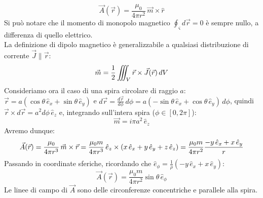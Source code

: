 \documentclass[]{article}
\begin{document}
\begin{equation}
	\vec{A}(\vec{r}) = \displaystyle\frac{\mu_0}{4\pi r^2} \, \vec{m}\times\hat{r}
	\label{eq:po-vett-sp-lont}
\end{equation}
Si può notare che il momento di monopolo magnetico $ \oint_{\varsigma} d\vec{r} = 0  $ è sempre nullo, a differenza di quello elettrico. \\ 
%
La definizione di dipolo magnetico è generalizzabile a qualsiasi distribuzione di corrente $ \vec{J} \parallel \vec{r} $:
\begin{equation}
	\vec{m} = \frac{1}{2} \iiint_V \vec{r}\times\vec{J}(\vec{r}) \, dV
	\label{eq:dip-mag-def}
\end{equation}
%
Consideriamo ora il caso di una spira circolare di raggio $ a $: $ \vec{r} = a (\cos\theta\,\hat{e}_x + \sin\theta\,\hat{e}_y) $ e $ d\vec{r} = \frac{d\vec{r}}{d\phi} \,d\phi = a (-\sin\theta\,\hat{e}_x + \cos\theta\,\hat{e}_y) \,d\phi $, quindi $ \vec{r}\times d\vec{r} = a^2 d\phi \, \hat{e}_z $ e, integrando sull'intera spira ($ \phi\in[0,2\pi] $):
\begin{equation}
	\vec{m} = i \pi a^2 \, \hat{e}_z
	\label{eq:mom-sp-circ}
\end{equation}
Avremo dunque:
\begin{equation}
	\vec{A}(\vec{r}) = \displaystyle\frac{\mu_0}{4\pi r^3} \, \vec{m}\times\vec{r} = \displaystyle\frac{\mu_0 m}{4\pi r^3} \, \hat{e}_z \times\left(x\,\hat{e}_x + y\,\hat{e}_y + z\,\hat{e}_z\right) = \displaystyle\frac{\mu_0 m}{4\pi r^2} \displaystyle\frac{-y \, \hat{e}_x + x \, \hat{e}_y}{r}
	\label{eq:calc-po-sp-circ}
\end{equation}
Passando in coordinate sferiche, ricordando che $ \hat{e}_{\phi} = \frac{1}{\rho} (-y \, \hat{e}_x + x \, \hat{e}_y) $:
\begin{equation}
	\vec{A}(\vec{r}) = \displaystyle\frac{\mu_0 m}{4\pi r^2} \sin\theta \,\hat{e}_{\phi}
	\label{eq:po-sp-circ}
\end{equation}
Le linee di campo di $ \vec{A} $ sono delle circonferenze concentriche e parallele alla spira.
\end{document}
